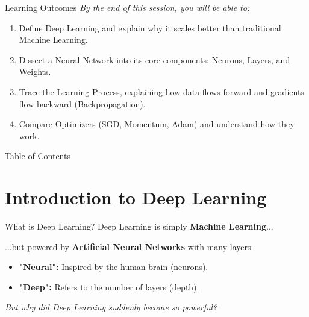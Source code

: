 \begin{frame}{Learning Outcomes}
    \vspace{0.5em}
    \textit{By the end of this session, you will be able to:}
    
    \vspace{1em}
    \begin{enumerate}
        \setlength\itemsep{1.2em} %
        
        \item Define Deep Learning and explain why it scales better than traditional Machine Learning.
        
        \item Dissect a Neural Network into its core components: Neurons, Layers, and Weights.
        
        \item Trace the Learning Process, explaining how data flows forward and gradients flow backward (Backpropagation).
        
        \item Compare Optimizers (SGD, Momentum, Adam) and understand how they work.
    \end{enumerate}
\end{frame}

\begin{frame}{Table of Contents}
    \tableofcontents
\end{frame}

\section{Introduction to Deep Learning}

\begin{frame}{What is Deep Learning?}
    \centering
    \Large
    Deep Learning is simply \textbf{Machine Learning}...
    
    \vspace{0.5em}
    ...but powered by \textbf{Artificial Neural Networks} with many layers.
    
    \vspace{1.5em}
    \normalsize
    \begin{itemize}
        \item \textbf{"Neural":} Inspired by the human brain (neurons).
        \item \textbf{"Deep":} Refers to the number of layers (depth).
    \end{itemize}
    
    \pause
    \vspace{1em}
    \textit{But why did Deep Learning suddenly become so powerful?}
\end{frame}

